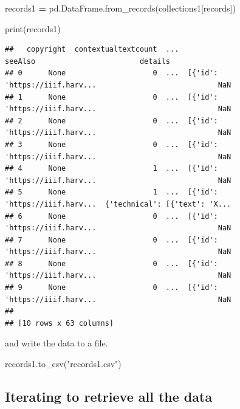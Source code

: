 \documentclass[
]{book}
\newenvironment{Shaded}{\begin{snugshade}}{\end{snugshade}}
\newcommand{\BuiltInTok}[1]{#1}
\newcommand{\NormalTok}[1]{#1}
\newcommand{\OperatorTok}[1]{\textcolor[rgb]{0.81,0.36,0.00}{\textbf{#1}}}
\newcommand{\StringTok}[1]{\textcolor[rgb]{0.31,0.60,0.02}{#1}}
\begin{document}
\begin{Shaded}
\begin{Highlighting}[]
\NormalTok{records1 }\OperatorTok{=}\NormalTok{ pd.DataFrame.from\_records(collections1[}\StringTok{\textquotesingle{}records\textquotesingle{}}\NormalTok{])}
\end{Highlighting}
\end{Shaded}

\begin{Shaded}
\begin{Highlighting}[]
\BuiltInTok{print}\NormalTok{(records1)}
\end{Highlighting}
\end{Shaded}

\begin{verbatim}
##   copyright  contextualtextcount  ...                        seeAlso                        details
## 0      None                    0  ...  [{'id': 'https://iiif.harv...                            NaN
## 1      None                    0  ...  [{'id': 'https://iiif.harv...                            NaN
## 2      None                    0  ...  [{'id': 'https://iiif.harv...                            NaN
## 3      None                    0  ...  [{'id': 'https://iiif.harv...                            NaN
## 4      None                    1  ...  [{'id': 'https://iiif.harv...                            NaN
## 5      None                    1  ...  [{'id': 'https://iiif.harv...  {'technical': [{'text': 'X...
## 6      None                    0  ...  [{'id': 'https://iiif.harv...                            NaN
## 7      None                    0  ...  [{'id': 'https://iiif.harv...                            NaN
## 8      None                    0  ...  [{'id': 'https://iiif.harv...                            NaN
## 9      None                    0  ...  [{'id': 'https://iiif.harv...                            NaN
## 
## [10 rows x 63 columns]
\end{verbatim}

and write the data to a file.

\begin{Shaded}
\begin{Highlighting}[]
\NormalTok{records1.to\_csv(}\StringTok{"records1.csv"}\NormalTok{)}
\end{Highlighting}
\end{Shaded}

\hypertarget{iterating-to-retrieve-all-the-data}{%
\subsection{Iterating to retrieve all the data}\label{iterating-to-retrieve-all-the-data}}
\end{document}

